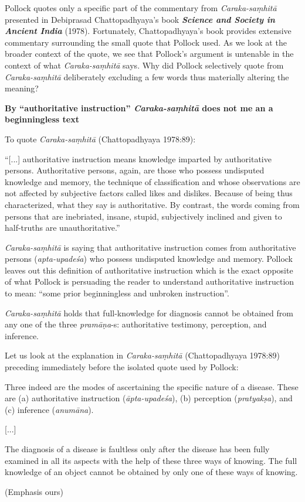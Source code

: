 Pollock quotes only a specific part of the commentary from {\sl Caraka-saṃhitā} presented in Debiprasad Chattopadhyaya's book {\sl\bfseries Science and Society in Ancient India} (1978).  Fortunately, Chattopadhyaya's book provides extensive commentary surrounding the small quote that Pollock used. As we look at the broader context of the quote, we see that Pollock's argument is untenable in the context of what {\sl Caraka-saṃhitā} says. Why did Pollock selectively quote from {\sl Caraka-saṃhitā} deliberately excluding a few words thus materially altering the meaning?

{\bf By ``authoritative instruction'' {{\sl\bfseries Caraka-saṃhitā}\relax} does not me	an a beginningless text}

To quote {\sl Caraka-saṃhitā} (Chattopadhyaya 1978:89):
\begin{myquote}
``[...] authoritative instruction means knowledge imparted by authoritative persons. Authoritative persons, again, are those who possess undisputed knowledge and memory, the technique of classification and whose observations are not affected by subjective factors called likes and dislikes. Because of being thus characterized, what they say is authoritative.  By contrast, the words coming from persons that are inebriated, insane, stupid, subjectively inclined and given to half-truths are unauthoritative.''
\end{myquote}

{\sl Caraka-saṃhitā} is saying that authoritative instruction comes from authoritative persons ({\sl apta-upadeśa}) who possess undisputed knowledge and memory. Pollock leaves out this definition of authoritative instruction which is the exact opposite of what Pollock is persuading the reader to understand authoritative instruction to mean: ``some prior beginningless and unbroken instruction''.

{\sl Caraka-saṃhitā} holds that full-knowledge for diagnosis cannot be obtained from any one of the three {\sl pramāṇa}-s: authoritative testimony, perception, and inference.

Let us look at the explanation in {\sl Caraka-saṃhitā} (Chattopadhyaya 1978:89) preceding immediately before the isolated quote used by Pollock:
\begin{myquote}
Three indeed are the modes of ascertaining the specific nature of a disease. These are (a) authoritative instruction ({\sl āpta-upadeśa}), (b) perception ({\sl pratyakṣa}), and (c) inference ({\sl anumāna}).

[...]

The diagnosis of a disease is faultless only after the disease has been fully examined in all its aspects with the help of these three ways of knowing. The full knowledge of an object cannot be obtained by only one of these ways of knowing.

\hfill (Emphasis ours)
\end{myquote}

